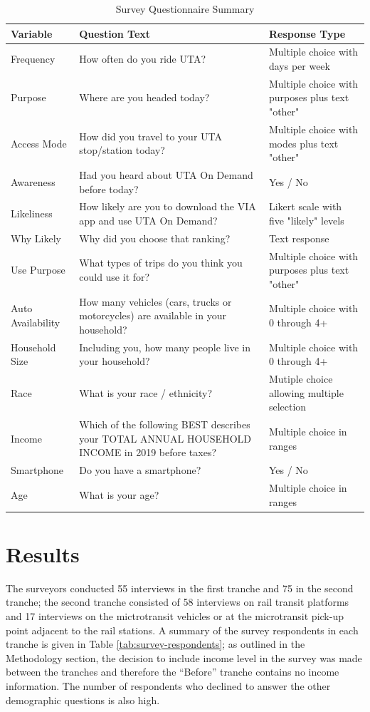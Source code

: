 \documentclass[smartcities,article,submit,moreauthors,pdftex]{Definitions/mdpi}
\begin{document}
\begin{table}[ht]
\renewcommand{\arraystretch}{1.5}
    \centering
    \caption{Survey Questionnaire Summary}
    \label{tab:survey-summary}
\begin{tabular}[t]{lp{}p{}}
\toprule
Variable & Question Text & Response Type\\
\midrule
Frequency & How often do you ride UTA? & Multiple choice with days per week\\
Purpose & Where are you headed today? & Multiple choice with purposes plus text "other"\\
Access Mode & How did you travel to your UTA stop/station today? & Multiple choice with modes plus text "other"\\
Awareness & Had you heard about UTA On Demand before today? & Yes / No\\
Likeliness & How likely are you to download the VIA app and use UTA On Demand? & Likert scale with five "likely" levels\\
\addlinespace
Why Likely & Why did you choose that ranking? & Text response\\
Use Purpose & What types of trips do you think you could use it for? & Multiple choice with purposes plus text "other"\\
Auto Availability & How many vehicles (cars, trucks or motorcycles) are available in your household? & Multiple choice with 0 through 4+\\
Household Size & Including you, how many people live in your household? & Multiple choice with 0 through 4+\\
Race & What is your race / ethnicity? & Mutiple choice allowing multiple selection\\
\addlinespace
Income & Which of the following BEST describes your TOTAL ANNUAL HOUSEHOLD INCOME in 2019 before taxes? & Multiple choice in ranges\\
Smartphone & Do you have a smartphone? & Yes / No\\
Age & What is your age? & Multiple choice in ranges\\
\bottomrule
\end{tabular}
\end{table}

\section{Results}

The surveyors conducted 55 interviews in the first tranche and 75 in the second tranche; the second tranche consisted of 58 interviews on rail transit platforms and 17 interviews on the mictrotransit vehicles or at the microtransit pick-up point adjacent to the rail stations. A summary of the survey respondents in each tranche is given in Table \ref{tab:survey-respondents}; as outlined in the Methodology section, the decision to include income level in the survey was made between the tranches and therefore the “Before” tranche contains no income information. The number of respondents who declined to answer the other demographic questions is also high.
\end{document}
